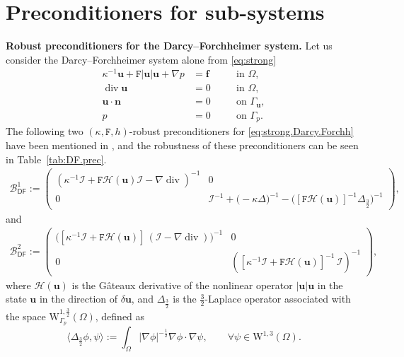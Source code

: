 \documentclass[11pt, reqno, a4paper, twoside]{article}
\newcommand{\bn}{\boldsymbol{n}}
\newcommand{\bu}{\boldsymbol{u}}
\renewcommand{\bf}{\boldsymbol{f}}
\newcommand{\rF}{\mathtt{F}}
\newcommand{\rW}{\mathrm{W}}
\newcommand\vdiv{\mathop{\mathrm{div}}\nolimits}
\numberwithin{equation}{section}
\numberwithin{remark}{section}
\numberwithin{figure}{section}
\numberwithin{table}{section}
\begin{document}
    
    \small 



\appendix 
\section{Preconditioners for sub-systems}
\smallskip
\noindent\textbf{Robust preconditioners for the Darcy--Forchheimer system.} 
Let us consider the Darcy--Forchheimer system alone from \eqref{eq:strong}
\begin{equation}\label{eq:strong.Darcy.Forchh}
\begin{aligned}
    \kappa^{-1}\bu + {\rF|\bu|\bu} + \nabla p & = \bf \quad && \text{in }\Omega,\\
    \vdiv \bu & = 0 \quad && \text{in }\Omega,\\
    \bu \cdot \bn & = 0 \quad && \text{on }\Gamma_{\bu},\\
    p & = 0 \quad && \text{on }\Gamma_p.
\end{aligned}
\end{equation}
The following two \((\kappa, \rF, h)\)-robust preconditioners for \eqref{eq:strong.Darcy.Forchh} have been mentioned in \cite[Section~5]{dhpr_sinum26}, and the robustness of these preconditioners can be seen in Table~\ref{tab:DF.prec}.
\begin{align}\label{precond.linear}
\mathcal{B}_{\mathsf{DF}}^1:=\begin{pmatrix}
        (\kappa^{-1}\mathcal{I}+\rF 
        {\mathcal{H}({\bu})} {\mathcal{I}}-\nabla\vdiv)^{-1} & 0\\0 &\mathcal{I}^{-1}+ {\bigl(-\kappa\Delta\bigr)^{-1}-\bigl([\rF{\mathcal{H}({\bu})}]^{-1}{\Delta_{{\frac32}}}\bigr)^{-1}}
    \end{pmatrix},\end{align} 
    and \begin{align}\label{precond.linear.new}
    \mathcal{B}_{\mathsf{DF}}^2:=\begin{pmatrix}
        \bigl([\kappa^{-1}\mathcal{I}+\rF 
        {\mathcal{H}({\bu})}]\, ({\mathcal{I}}-\nabla\vdiv)\bigr)^{-1} & 0\\0 &([\kappa^{-1}\mathcal{I}+\rF 
        {\mathcal{H}({\bu})}]^{-1}\,\mathcal{I})^{-1}
    \end{pmatrix},\end{align}
    where \(\mathcal{H}(\bu)\) is the G\^ateaux derivative of the nonlinear operator \(|\bu|\bu\) in the state \(\bu\) in the direction of \(\delta\bu\), and ${\Delta_{{\frac32}}}$ is the $\frac32$-Laplace operator associated with the space {$\rW^{1,\frac32}_{\Gamma_p}(\Omega)$}, defined as  
  \[{\langle \Delta_{\frac32}\phi,\psi\rangle := \int_\Omega |\nabla\phi|^{-\frac12}\nabla \phi \cdot \nabla \psi, \qquad \forall \psi \in \rW^{1,3}(\Omega).} \] 
  
\end{document}
